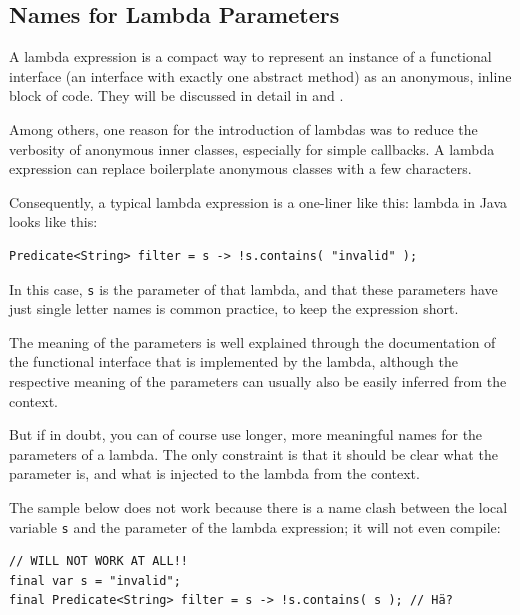 
\subsection{Names for Lambda Parameters}\label{sec:NamesForLambdaParameters}
A lambda expression is a compact way to represent an instance of a functional interface (an interface with exactly one abstract method) as an anonymous, inline block of code. They will be discussed in detail in  and .

Among others, one reason for the introduction of lambdas was to reduce the verbosity of anonymous inner classes, especially for simple callbacks. A lambda expression can replace boilerplate anonymous classes with a few characters.

Consequently, a typical lambda expression is a one-liner like this:
lambda in Java looks like this:
\begin{lstlisting}
Predicate<String> filter = s -> !s.contains( "invalid" );
\end{lstlisting}
In this case, \lstinline|s| is the parameter of that lambda, and that these parameters have just single letter names is common practice, to keep the expression short. 

The meaning of the parameters is well explained through the documentation of the functional interface that is implemented by the lambda, although the respective meaning of the parameters can usually also be easily inferred from the context.

But if in doubt, you can of course use longer, more meaningful names for the parameters of a lambda. The only constraint is that it should be clear what the parameter is, and what is injected to the lambda from the context.

The sample below does not work because there is a name clash between the local variable \lstinline|s| and the parameter of the lambda expression; it will not even compile:
\begin{lstlisting}
// WILL NOT WORK AT ALL!!
final var s = "invalid";
final Predicate<String> filter = s -> !s.contains( s ); // Hä?
\end{lstlisting}


